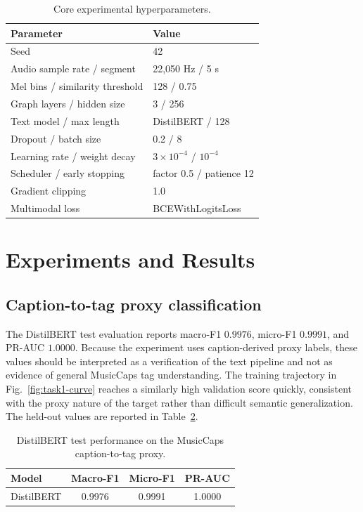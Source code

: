 \documentclass[conference]{IEEEtran}
\begin{document}
\begin{table}[!ht]
\caption{Core experimental hyperparameters.}
\label{tab:hyperparameters}
\centering
\begin{tabular}{ll}
\toprule
Parameter & Value\\
\midrule
Seed & 42\\
Audio sample rate / segment & 22,050 Hz / 5 s\\
Mel bins / similarity threshold & 128 / 0.75\\
Graph layers / hidden size & 3 / 256\\
Text model / max length & DistilBERT / 128\\
Dropout / batch size & 0.2 / 8\\
Learning rate / weight decay & $3\times10^{-4}$ / $10^{-4}$\\
Scheduler / early stopping & factor 0.5 / patience 12\\
Gradient clipping & 1.0\\
Multimodal loss & BCEWithLogitsLoss\\
\bottomrule
\end{tabular}
\end{table}

\section{Experiments and Results}
\subsection{Caption-to-tag proxy classification}
The DistilBERT test evaluation reports macro-F1 $0.9976$, micro-F1
$0.9991$, and PR-AUC $1.0000$. Because the experiment uses caption-derived
proxy labels, these values should be interpreted as a verification of the
text pipeline and not as evidence of general MusicCaps tag understanding.
The training trajectory in Fig.~\ref{fig:task1-curve} reaches a similarly
high validation score quickly, consistent with the proxy nature of the target
rather than difficult semantic generalization. The held-out values are
reported in Table~\ref{tab:task1}.

\begin{table}[!ht]
\caption{DistilBERT test performance on the MusicCaps caption-to-tag proxy.}
\label{tab:task1}
\centering
\begin{tabular}{lccc}
\toprule
Model & Macro-F1 & Micro-F1 & PR-AUC\\
\midrule
DistilBERT & 0.9976 & 0.9991 & 1.0000\\
\bottomrule
\end{tabular}
\end{table}
\end{document}
